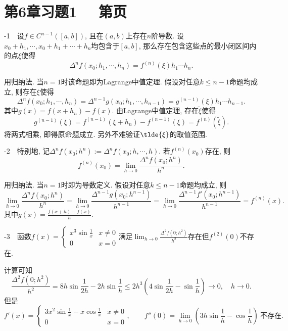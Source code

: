 \newpage
\section*{第6章习题1 ~~\small 第\pageref{sec:ex6.1}页}

-1~~设$f \in C^{n-1}([a,b])$, 且在$(a,b)$上存在$n$阶导数. 设$x_0+h_1,\cdots ,x_0+h_1+\cdots +h_n$均包含于$[a,b]$, 那么存在包含这些点的最小闭区间内的点$\xi$使得$$\Delta ^n f(x_0;h_1,\cdots ,h_n) = f^{(n)}(\xi) h_1\cdots h_n. $$
\begin{exsolution}
	用归纳法. 当$n=1$时该命题即为Lagrange中值定理. 假设对任意$k \leq n-1$命题均成立, 则存在$\xi$使得$$\Delta ^n f(x_0;h_1,\cdots ,h_n) = \Delta ^{n-1}g(x_0;h_1,\cdots ,h_{n-1}) = g^{(n-1)}(\xi) h_1\cdots h_{n-1}. $$
	其中$g(x)=f(x+h_n)-f(x)$. 由Lagrange中值定理, 存在$\tilde{\xi}$使得$$g^{(n-1)}(\xi) = f^{(n-1)}(\xi + h_n) - f^{(n-1)}(\xi) = f^{(n)}(\tilde{\xi}). $$
	将两式相乘, 即得原命题成立. 另外不难验证$\tlde{\xi}$的取值范围. 
\end{exsolution}

-2~~特别地, 记$\Delta ^nf(x_0;h^n) := \Delta ^nf(x_0;h,\cdots ,h)$. 若$f^{(n)}(x_0)$存在, 则$$f^{(n)}(x_0) = \lim_{h \to 0} \frac{\Delta ^n f(x_0;h^n)}{h^n}. $$
\begin{exsolution}
	用归纳法. 当$n=1$时即为导数定义. 假设对任意$k \leq n-1$命题均成立, 则$$\lim_{h \to 0} \frac{\Delta ^n f(x_0;h^n)}{h^n} = \lim_{h \to 0} \frac{\Delta ^{n-1} g(x_0;h^{n-1})}{h^{n-1}} = \lim_{h\to 0} \frac{\Delta ^{n-1}f'(x_0;h^{n-1})}{h^{n-1}} = f^{(n)}(x). $$
	其中$g(x) = \frac{f(x+h)-f(x)}{h}$. 
\end{exsolution}

-3~~函数$f(x)=\begin{cases}
	x^3\sin \frac{1}{x} & x\neq 0 \\ 0 & x = 0
\end{cases}$满足$\displaystyle \lim_{h\to 0} \frac{\Delta ^2 f(0;h^2)}{h^2}$存在但$f^{(2)}(0)$不存在. 
\begin{exsolution}
	计算可知$$\frac{\Delta ^2 f(0;h^2)}{h^2} = 8h\sin \frac{1}{2h} - 2h\sin \frac{1}{h} \leq 2h^3\left(4\sin \frac{1}{2h} - \sin \frac{1}{h} \right) \to 0,\quad h\to 0. $$
	但是$$f'(x) = \begin{cases}
		3x^2\sin \frac{1}{x} - x\cos \frac{1}{x} & x \neq 0 \\ 0 & x=0
	\end{cases},\qquad f''(0)=\lim_{h\to 0} \left( 3h\sin \frac{1}{h}-\cos \frac{1}{h} \right)~\textit{不存在}.$$
\end{exsolution}

